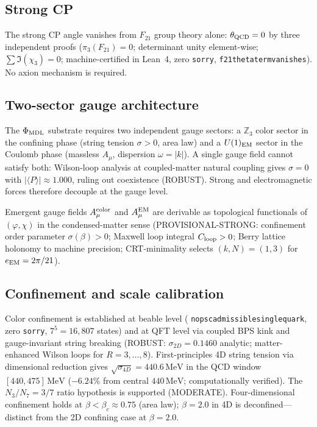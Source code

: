 \documentclass[11pt]{article}
\theoremstyle{remark}
\newcommand{\Zthree}{\mathbb{Z}_3}
\newcommand{\lean}[1]{%
  \penalty-100
  \begingroup\def\_{\textunderscore\allowbreak}\texttt{#1}\endgroup}
\newcommand{\phimdl}{\Phi_{\rm MDL}}
\newcommand{\Ftwentyone}{F_{21}}
\begin{document}
\subsection{Strong CP}

The strong CP angle vanishes from $\Ftwentyone$ group theory alone:
$\theta_{\rm QCD} = 0$ by three independent proofs
($\pi_3(\Ftwentyone) = 0$; determinant unity element-wise;
$\sum \Im(\chi_3) = 0$; machine-certified in Lean~4, zero \texttt{sorry},
\lean{f21\_theta\_term\_vanishes}).
No axion mechanism is required.

\subsection{Two-sector gauge architecture}

The $\phimdl$ substrate requires two independent gauge sectors:
a $\Zthree$ color sector in the confining phase (string tension $\sigma > 0$, area law)
and a $U(1)_{\rm EM}$ sector in the Coulomb phase (massless $A_\mu$, dispersion
$\omega = |k|$).
A single gauge field cannot satisfy both: Wilson-loop analysis at coupled-matter
natural coupling gives $\sigma = 0$ with $|\langle P \rangle| \approx 1.000$,
ruling out coexistence (ROBUST).
Strong and electromagnetic forces therefore decouple at the gauge level.

Emergent gauge fields $A_\mu^{\rm color}$ and $A_\mu^{\rm EM}$ are derivable as
topological functionals of $(\varphi, \chi)$ in the condensed-matter sense
(PROVISIONAL-STRONG: confinement order parameter $\sigma(\beta) > 0$;
Maxwell loop integral $C_{\rm loop} > 0$; Berry lattice holonomy to machine
precision; CRT-minimality selects $(k,N) = (1,3)$ for $e_{\rm EM} = 2\pi/21$).

\subsection{Confinement and scale calibration}

Color confinement is established at beable level
(\lean{no\_psc\_admissible\_single\_quark}, zero \texttt{sorry}, $7^5 = 16{,}807$ states)
and at QFT level via coupled BPS kink and gauge-invariant string breaking
(ROBUST: $\sigma_{2D} = 0.1460$ analytic; matter-enhanced Wilson loops for
$R = 3,\ldots,8$).
First-principles 4D string tension via dimensional reduction gives
$\sqrt{\sigma_{4D}} = 440.6\,\text{MeV}$ in the QCD window $[440, 475]\,\text{MeV}$
($-6.24\%$ from central $440\,\text{MeV}$; computationally verified).
The $N_3/N_7 = 3/7$ ratio hypothesis is supported (MODERATE).
Four-dimensional confinement holds at $\beta < \beta_c \approx 0.75$ (area law);
$\beta = 2.0$ in 4D is deconfined---distinct from the 2D confining case at $\beta = 2.0$.
\end{document}
